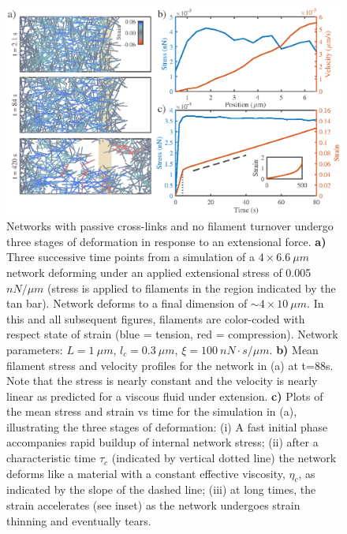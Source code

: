 \documentclass[10pt,letterpaper]{article}
\begin{document}
\begin{figure}[h!]
\centering
\includegraphics[width=\hsize]{figures/figure3a}
\caption{\label{fig:passive_ex}  Networks with passive cross-links and no filament turnover undergo three stages of deformation in response to an extensional force.   \textbf{a)} Three successive time points from a simulation of a $4\times6.6\: \mu m$ network deforming under an applied extensional stress of 0.005 $nN/\mu m$ (stress is applied to filaments in the region indicated by the tan bar). Network deforms to a final dimension of $\sim4\times10\: \mu m$. In this and all subsequent figures, filaments are color-coded with respect state of strain (blue = tension, red = compression).  Network parameters: $L=1\: \mu m$, $l_c=0.3\: \mu m$, $\xi=100\: nN\cdot s/\mu m$. \textbf{b)} Mean filament stress and velocity profiles for the  network in (a) at t=88s. Note that the stress is nearly constant and the velocity is nearly linear as predicted for a viscous fluid under extension.  \textbf{c)} Plots of the mean stress and strain vs time for the simulation in (a), illustrating the three stages of deformation: (i) A fast initial phase accompanies rapid buildup of internal network stress; (ii) after a characteristic time $\tau_c$ (indicated by vertical dotted line) the network deforms like a material with a constant effective viscosity, $\eta_c$, as indicated by the slope of the dashed line; (iii) at long times, the strain accelerates (see inset) as the network undergoes strain thinning and eventually tears. }
\end{figure}

\end{document}
